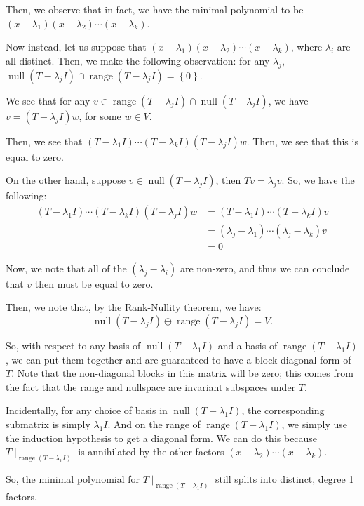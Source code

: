 \documentclass[openany]{book}
\DeclareMathOperator*{\vnull}{null}
\DeclareMathOperator*{\vrange}{range}
\begin{document}
Then, we observe that in fact, we have the minimal polynomial to be $(x-\lambda_1)(x-\lambda_2) \cdots (x-\lambda_k)$.

Now instead, let us suppose that $(x-\lambda_1)(x- \lambda_2)\cdots(x-\lambda_k)$, where $\lambda_i$ are all distinct. Then, we make the following observation: for any $\lambda_j$, $\vnull (T - \lambda_j I) \cap \vrange (T - \lambda_jI) = \left\{  0 \right\}$.

We see that for any $v \in \vrange (T-\lambda_j I) \cap \vnull (T - \lambda_j I)$, we have $v = (T- \lambda_j I) w$, for some $w \in V$.

Then, we see that $(T - \lambda_{1} I) \cdots (T - \lambda_k I)(T-\lambda_j I)w$. Then, we see that this is equal to zero.

On the other hand, suppose $v \in \vnull (T - \lambda_j I)$, then $Tv = \lambda_j v$. So, we have the following:
\begin{align*}
	(T-\lambda_{1} I) \cdots (T-\lambda_kI)(T-\lambda_j I)w &= (T-\lambda_1I)\cdots(T-\lambda_k I)v \\
	&= (\lambda_j - \lambda_1) \cdots (\lambda_j-\lambda_k)v \\
	&= 0
\end{align*}

Now, we note that all of the $(\lambda_j - \lambda_i)$ are non-zero, and thus we can conclude that $v$ then must be equal to zero.

Then, we note that, by the Rank-Nullity theorem, we have:
\begin{equation*}
	\vnull (T - \lambda_j I) \oplus \vrange (T - \lambda_j I) = V.
\end{equation*}

So, with respect to any basis of $\vnull(T - \lambda_1 I)$ and a basis of $\vrange (T - \lambda_{1} I)$, we can put them together and are guaranteed to have a block diagonal form of $T$. Note that the non-diagonal blocks in this matrix will be zero; this comes from the fact that the range and nullspace are invariant subspaces under $T$.

Incidentally, for any choice of basis in $\vnull (T-\lambda_1 I)$, the corresponding submatrix is simply $\lambda_1 I$. And on the range of $\vrange (T-\lambda_1 I)$, we simply use the induction hypothesis to get a diagonal form. We can do this because $T \mid_{\vrange (T-\lambda_1 I)}$ is annihilated by the other factors $(x-\lambda_2) \cdots (x- \lambda_k)$.

So, the minimal polynomial for $T\mid_{\vrange (T-\lambda_1 I)}$ still splits into distinct, degree 1 factors.
\end{document}
